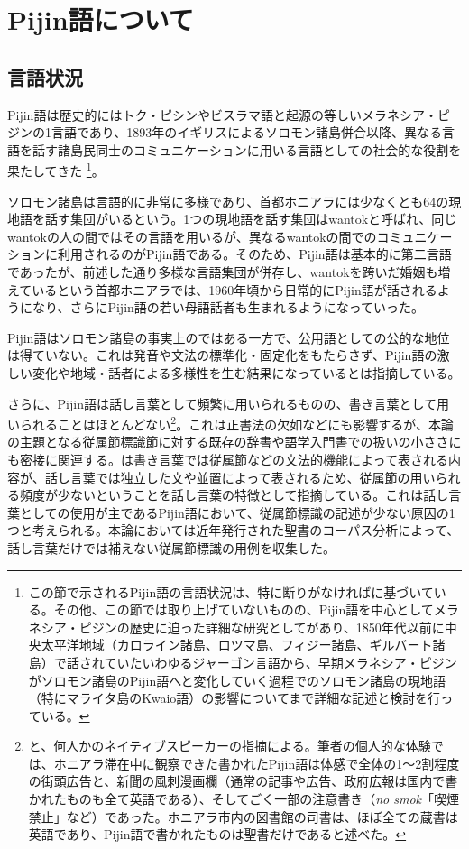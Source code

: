 \section{Pijin語について}
\subsection{言語状況}
Pijin語は歴史的にはトク・ピシンやビスラマ語と起源の等しいメラネシア・ピジンの1言語であり、1893年のイギリスによるソロモン諸島併合以降、異なる言語を話す諸島民同士のコミュニケーションに用いる言語としての社会的な役割を果たしてきた
\footnote{
この節で示されるPijin語の言語状況は、特に断りがなければ\cite{phonology}に基づいている。その他、この節では取り上げていないものの、Pijin語を中心としてメラネシア・ピジンの歴史に迫った詳細な研究として\cite{keesing}があり、1850年代以前に中央太平洋地域（カロライン諸島、ロツマ島、フィジー諸島、ギルバート諸島）で話されていたいわゆるジャーゴン言語から、早期メラネシア・ピジンがソロモン諸島のPijin語へと変化していく過程でのソロモン諸島の現地語（特にマライタ島のKwaio語）の影響についてまで詳細な記述と検討を行っている。}。

ソロモン諸島は言語的に非常に多様であり、首都ホニアラには少なくとも64の現地語を話す集団がいるという\citep{nativization}。1つの現地語を話す集団はwantokと呼ばれ、同じwantokの人の間ではその言語を用いるが、異なるwantokの間でのコミュニケーションに利用されるのがPijin語である。そのため、Pijin語は基本的に第二言語であったが、前述した通り多様な言語集団が併存し、wantokを跨いだ婚姻も増えているという首都ホニアラでは、1960年頃から日常的にPijin語が話されるようになり、さらにPijin語の若い母語話者も生まれるようになっていった。

Pijin語はソロモン諸島の事実上のではある一方で、公用語としての公的な地位は得ていない。これは発音や文法の標準化・固定化をもたらさず、Pijin語の激しい変化や地域・話者による多様性を生む結果になっていると\cite{phonology}は指摘している。

さらに、Pijin語は話し言葉として頻繁に用いられるものの、書き言葉として用いられることはほとんどない\footnote{
\cite{phonology}と、何人かのネイティブスピーカーの指摘による。筆者の個人的な体験では、ホニアラ滞在中に観察できた書かれたPijin語は体感で全体の1～2割程度の街頭広告と、新聞の風刺漫画欄（通常の記事や広告、政府広報は国内で書かれたものも全て英語である）、そしてごく一部の注意書き（\textit{no smok}「喫煙禁止」など）であった。ホニアラ市内の図書館の司書は、ほぼ全ての蔵書は英語であり、Pijin語で書かれたものは聖書だけであると述べた。}。これは正書法の欠如などにも影響するが、本論の主題となる従属節標識節に対する既存の辞書や語学入門書での扱いの小ささにも密接に関連する。\cite{chafe}は書き言葉では従属節などの文法的機能によって表される内容が、話し言葉では独立した文や並置によって表されるため、従属節の用いられる頻度が少ないということを話し言葉の特徴として指摘している。これは話し言葉としての使用が主であるPijin語において、従属節標識の記述が少ない原因の1つと考えられる。本論においては近年発行された聖書のコーパス分析によって、話し言葉だけでは補えない従属節標識の用例を収集した。

